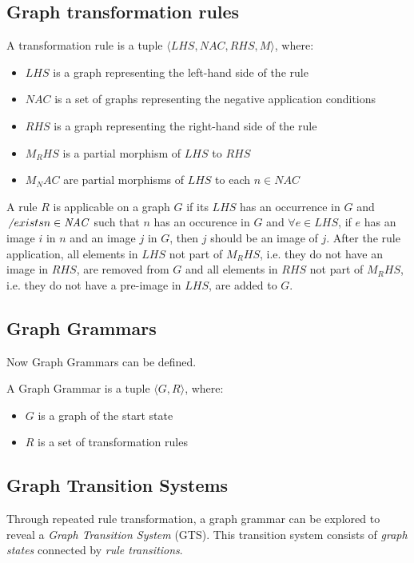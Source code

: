 \subsection{Graph transformation rules}
\begin{definition}
A transformation rule is a tuple $\langle \mathit{LHS}, \mathit{NAC}, \mathit{RHS}, \mathit{M}\rangle$, where:
\begin{itemize}
  \item $\mathit{LHS}$ is a graph representing the left-hand side of the rule
  \item $\mathit{NAC}$ is a set of graphs representing the negative application conditions
  \item $\mathit{RHS}$ is a graph representing the right-hand side of the rule
  \item $\mathit{M_RHS}$ is a partial morphism of $\mathit{LHS}$ to $\mathit{RHS}$ 
  \item $\mathit{M_NAC}$ are partial morphisms of $\mathit{LHS}$ to each $n \in \mathit{NAC}$
\end{itemize}
\end{definition}

A rule $R$ is applicable on a graph $G$ if its $\mathit{LHS}$ has an occurrence in $G$ and $\not\ exists n \in \mathit{NAC}$ such that $n$ has an occurence in $G$ and $\forall e \in \mathit{LHS}$, if $e$ has an image $i$ in $n$ and an image $j$ in $G$, then $j$ should be an image of $j$. After the rule application, all elements in $\mathit{LHS}$ not part of $\mathit{M_RHS}$, i.e. they do not have an image in $\mathit{RHS}$, are removed from $G$ and all elements in $\mathit{RHS}$ not part of $\mathit{M_RHS}$, i.e. they do not have a pre-image in $\mathit{LHS}$, are added to $G$.

\subsection{Graph Grammars}
Now Graph Grammars can be defined.
\begin{definition}
A Graph Grammar is a tuple $\langle G, R\rangle$, where:
\begin{itemize}
  \item $G$ is a graph of the start state
  \item $R$ is a set of transformation rules
\end{itemize}
\end{definition}

\subsection{Graph Transition Systems}
Through repeated rule transformation, a graph grammar can be explored to reveal a \textit{Graph Transition System} (GTS). This transition system consists of \textit{graph states} connected by \textit{rule transitions}.

